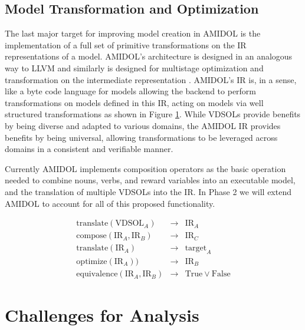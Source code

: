 \documentclass[11pt]{article}
\newcommand{\amidol}{\textsc{AMIDOL}}
\begin{document}
\subsection{Model Transformation and Optimization}

The last major target for improving model creation in \amidol{} is the
implementation of a full set of primitive transformations on the IR
representations of a model.  \amidol{}'s architecture is designed in
an analogous way to LLVM \cite{lattner2004llvm,lattner2008llvm} and
similarly is designed for multistage optimization and transformation
on the intermediate representation \cite{lattner2002llvm}.
\amidol{}'s IR is, in a sense, like a byte code language for models
allowing the backend to perform transformations on models defined in
this IR, acting on models via well structured transformations as shown
in Figure \ref{Fig:AMIDOLBackend}.  While VDSOLs provide benefits by
being diverse and adapted to various domains, the \amidol{} IR
provides benefits by being universal, allowing transformations to be
leveraged across domains in a consistent and verifiable manner.

Currently \amidol{} implements composition operators as the basic
operation needed to combine nouns, verbs, and reward variables into an
executable model, and the translation of multiple VDSOLs into the
IR. In Phase 2 we will extend \amidol{} to account for all of this 
proposed functionality.

\begin{figure}
  \begin{eqnarray}
    \mathrm{translate}(\mathrm{VDSOL}_A) & \rightarrow & \mathrm{IR}_A\\
    \mathrm{compose}(\mathrm{IR}_A, \mathrm{IR}_B) & \rightarrow & \mathrm{IR}_C\\
    \mathrm{translate}(\mathrm{IR}_A) & \rightarrow & \mathrm{target}_A\\
    \mathrm{optimize}(\mathrm{IR}_A)) & \rightarrow & \mathrm{IR}_B\\
    \mathrm{equivalence}(\mathrm{IR}_A, \mathrm{IR}_B) & \rightarrow & \mathrm{True} \vee \mathrm{False}
  \end{eqnarray}
  \caption{}
  \label{Fig:AMIDOLBackend}
\end{figure}

\section{Challenges for Analysis}
\end{document}
